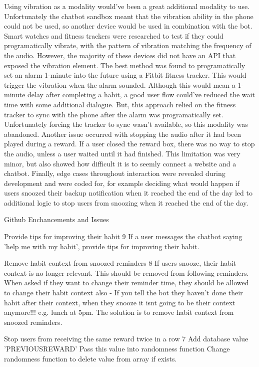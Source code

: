Using vibration as a modality would've been a great additional modality to use.
Unfortunately the chatbot sandbox meant that the vibration ability in the phone could not be used, so another device would be used in combination with the bot.
Smart watches and fitness trackers were researched to test if they could programatically vibrate, with the pattern of vibration matching the frequency of the audio.
However, the majority of these devices did not have an API that exposed the vibration element. The best method was found to programatically set an alarm 1-minute into the future using a Fitbit fitness tracker.
This would trigger the vibration when the alarm sounded.
Although this would mean a 1-minute delay after completing a habit, a good user flow could've reduced the wait time with some additional dialogue.
But, this approach relied on the fitness tracker to sync with the phone after the alarm was programatically set. Unfortunately forcing the tracker to sync wasn't available, so this modality was abandoned. Another issue occurred with stopping the audio after it had been played during a reward. If a user closed the reward box, there was no way to stop the audio, unless a user waited until it had finished. This limitation was very minor, but also showed how difficult it is to seemly connect a website and a chatbot. Finally, edge cases throughout interaction were revealed during development and were coded for, for example deciding what would happen if users snoozed their backup notification when it reached the end of the day led to additional logic to stop users from snoozing when it reached the end of the day.


Github Enchancements and Issues

Provide tips for improving their habit 9
    If a user messages the chatbot saying 'help me with my habit', provide tips for improving their habit.

Remove habit context from snoozed reminders 8
    If users snooze, their habit context is no longer relevant. This should be removed from following reminders. When asked if they want to change their reminder time, they should be allowed to change their habit context also
    - If you tell the bot they haven't done their habit after their context, when they snooze it isnt going to be their context anymore!!! e.g. lunch at 5pm. The solution is to remove habit context from snoozed reminders.

Stop users from receiving the same reward twice in a row 7
    Add database value 'PREVIOUSREWARD'
    Pass this value into randomness function
    Change randomness function to delete value from array if exists.

